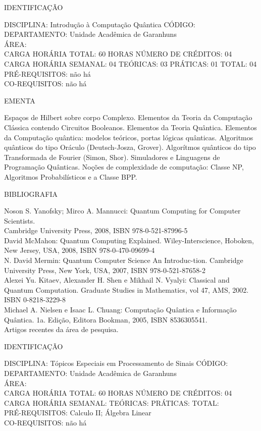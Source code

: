 \documentclass[
	12pt,				%
	openright,			%
  oneside,     %
	a4paper,			%
	chapter=TITLE,		%
	english,			%
	french,				%
	spanish,			%
	brazil				%
	]{abntex2}
\begin{document}
\begin{apendicesenv}
\newpage IDENTIFICAÇÃO

DISCIPLINA: Introdução à Computação Quântica CÓDIGO:\\ 
DEPARTAMENTO: Unidade Acadêmica de Garanhuns\\ 
ÁREA: \\
CARGA HORÁRIA TOTAL: 60 HORAS NÚMERO DE CRÉDITOS: 04\\
CARGA HORÁRIA SEMANAL: 04 TEÓRICAS: 03 PRÁTICAS: 01 TOTAL: 04\\
PRÉ-REQUISITOS: não há\\
CO-REQUISITOS: não há

EMENTA 

Espaços de Hilbert sobre corpo Complexo. Elementos da Teoria da
Computação Clássica contendo Circuitos Booleanos. Elementos da Teoria Quântica. Elementos da
Computação quântica: modelos teóricos, portas lógicas quânticas. Algoritmos
quânticos do tipo Oráculo (Deutsch-Josza, Grover). Algorítmos quânticos do tipo Transformada de
Fourier (Simon, Shor). Simuladores e Linguagens de Programação Quânticas. Noções de
complexidade de computação: Classe NP, Algoritmos Probabilísticos e a Classe BPP.

BIBLIOGRAFIA 

Noson S. Yanofsky; Mirco A. Mannucci: Quantum Computing for Computer
Scientists.\\
Cambridge University Press, 2008, ISBN 978-0-521-87996-5 \\
David McMahon: Quantum Computing Explained. Wiley-Interscience,
Hoboken, New Jersey, USA, 2008, ISBN 978-0-470-09699-4\\
N. David Mermin: Quantum Computer Science  An Introduc-tion.
Cambridge University Press, New York, USA, 2007, ISBN 978-0-521-87658-2\\
Alexei Yu. Kitaev, Alexander H. Shen e Mikhail N. Vyalyi: Classical
and Quantum Computation. Graduate Studies in Mathematics, vol 47, AMS, 2002. ISBN
0-8218-3229-8\\
Michael A. Nielsen e Isaac L. Chuang: Computação Quântica e
Informação Quântica. 1a. Edição, Editora Bookman, 2005, ISBN 8536305541.\\
Artigos recentes da área de pesquisa.

\newpage IDENTIFICAÇÃO

DISCIPLINA: Tópicos Especiais em Processamento de Sinais CÓDIGO:\\ 
DEPARTAMENTO: Unidade Acadêmica de Garanhuns\\
ÁREA: \\
CARGA HORÁRIA TOTAL: 60 HORAS NÚMERO DE CRÉDITOS: 04\\
CARGA HORÁRIA SEMANAL: TEÓRICAS: PRÁTICAS: TOTAL: \\
PRÉ-REQUISITOS: Calculo II; Álgebra Linear\\
CO-REQUISITOS: não há


\end{apendicesenv}
\end{document}
